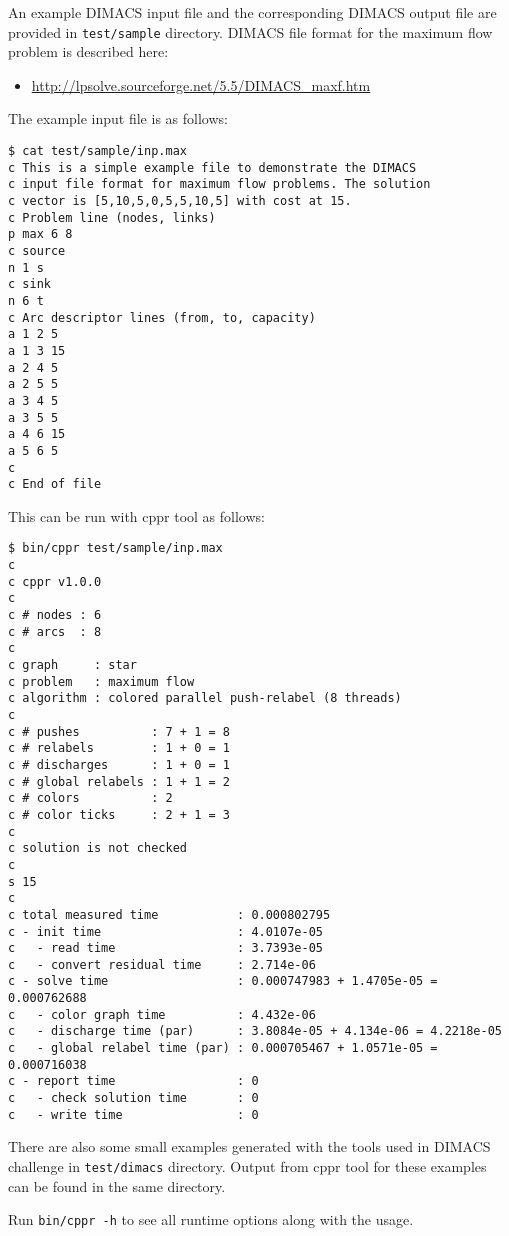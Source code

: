 \documentclass{article}
\begin{document}
An example DIMACS input file and the corresponding DIMACS output file are
provided in \texttt{test/sample} directory. DIMACS file format for the maximum flow
problem is described here:

\begin{itemize}
    \item \url{http://lpsolve.sourceforge.net/5.5/DIMACS_maxf.htm}
\end{itemize}

The example input file is as follows:

\begin{verbatim}
$ cat test/sample/inp.max
c This is a simple example file to demonstrate the DIMACS
c input file format for maximum flow problems. The solution
c vector is [5,10,5,0,5,5,10,5] with cost at 15.
c Problem line (nodes, links)
p max 6 8
c source
n 1 s
c sink
n 6 t
c Arc descriptor lines (from, to, capacity)
a 1 2 5
a 1 3 15
a 2 4 5
a 2 5 5
a 3 4 5
a 3 5 5
a 4 6 15
a 5 6 5
c
c End of file
\end{verbatim}

This can be run with cppr tool as follows:

\begin{verbatim}
$ bin/cppr test/sample/inp.max
c
c cppr v1.0.0
c
c # nodes : 6
c # arcs  : 8
c
c graph     : star
c problem   : maximum flow
c algorithm : colored parallel push-relabel (8 threads)
c
c # pushes          : 7 + 1 = 8
c # relabels        : 1 + 0 = 1
c # discharges      : 1 + 0 = 1
c # global relabels : 1 + 1 = 2
c # colors          : 2
c # color ticks     : 2 + 1 = 3
c
c solution is not checked
c
s 15
c
c total measured time           : 0.000802795
c - init time                   : 4.0107e-05
c   - read time                 : 3.7393e-05
c   - convert residual time     : 2.714e-06
c - solve time                  : 0.000747983 + 1.4705e-05 = 0.000762688
c   - color graph time          : 4.432e-06
c   - discharge time (par)      : 3.8084e-05 + 4.134e-06 = 4.2218e-05
c   - global relabel time (par) : 0.000705467 + 1.0571e-05 = 0.000716038
c - report time                 : 0
c   - check solution time       : 0
c   - write time                : 0
\end{verbatim}

There are also some small examples generated with the tools used in DIMACS
challenge in \texttt{test/dimacs} directory. Output from cppr tool for these
examples can be found in the same directory.

Run \texttt{bin/cppr -h} to see all runtime options along with the usage.
\end{document}
